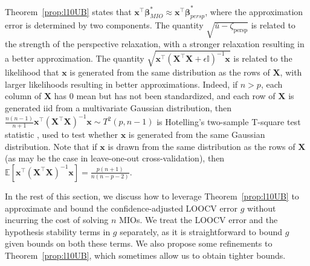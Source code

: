 \documentclass[opre,nonblindrev]{informs3} %
\begin{document}
\begin{remark}[Intuition]\label{rem:intuition}
	Theorem~\ref{prop:l10UB} states that $\bm{x}^\top \bm{\beta}_{MIO}^*\approx\bm{x^\top\beta}_{persp}^*$, where the approximation error is determined by two components. The quantity $\sqrt{\bar u-\zeta_{\text{persp}}}$ is related to the strength of the perspective relaxation, with a stronger relaxation resulting in a better approximation. The quantity $\sqrt{\bm{x^\top}\left(\bm{X^\top X}+\epsilon\mathbb{I}\right)^{-1}\bm{x}}$ is related to the likelihood that $\bm{x}$ is generated from the same distribution as the rows of $\bm{X}$, with larger likelihoods resulting in better approximations. Indeed, if $n>p$, each column of $\bm{X}$ has $0$ mean but has not been standardized, and each row of $\bm{X}$ is generated iid from a multivariate Gaussian distribution, then $\frac{n(n-1)}{n+1}\bm{x^\top}\left(\bm{X^\top X}\right)^{-1}\bm{x}\sim T^2(p, n-1)$ is Hotelling's two-sample T-square test statistic \citep{hotelling1931generalization}, used to test whether $\bm{x}$ is generated from the same Gaussian distribution. Note that if $\bm{x}$ is drawn from the same distribution as the rows of $\bm{X}$ (as may be the case in leave-one-out cross-validation), then $\mathbb{E}\left[\bm{x^\top}\left(\bm{X^\top X}\right)^{-1}\bm{x}\right]=\frac{p(n+1)}{n(n-p-2)}$.
\end{remark}


In the rest of this section, we discuss how to leverage Theorem~\ref{prop:l10UB} to approximate and bound the confidence-adjusted LOOCV error $g$ without incurring the cost of solving $n$ MIOs. We treat the LOOCV error and the hypothesis stability terms in $g$ separately, as it is straightforward to bound $g$ given bounds on both these terms. We also propose some refinements to Theorem~\ref{prop:l10UB}, which sometimes allow us to obtain tighter bounds.
\end{document}
